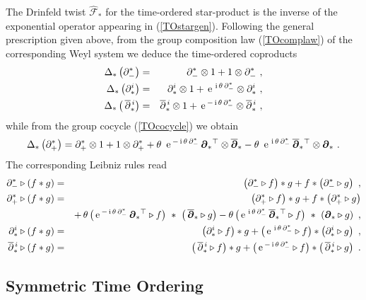 \documentclass[11pt,a4paper]{article}
\newcommand{\1}{\mathbb{1}}
\newcommand{\mbf}[1]{{\boldsymbol {#1} }}
\def\ii{{\,{\rm i}\,}}
\def\mdell{{\mbf\partial}}
\def\e{{\,\rm e}\,}
\def\bea{\begin{eqnarray}}
\def\eea{\end{eqnarray}}
\newcommand{\beq}{\begin{eqnarray}}
\newcommand{\eeq}{\end{eqnarray}}
\begin{document}
The Drinfeld twist $\hat{\mathcal F}_*$ for the time-ordered
star-product is the inverse of the exponential operator appearing in
(\ref{TOstargen}). Following the general prescription given above,
from the group composition law (\ref{TOcomplaw}) of the corresponding
Weyl system we deduce the time-ordered coproducts
\bea
\Delta_*\left(\partial_-^*\right)&=&\partial_-^*\otimes1+
1\otimes\partial_-^* \ , \nonumber\\
\Delta_*\left(\partial^i_*\right)&=&\partial^i_*\otimes1+
\e^{\ii\theta\,\partial_-^*}\otimes\partial^i_* \ , \nonumber\\
\Delta_*\left(\,\overline{\partial}{}^{\,i}_*\right)&=&
\overline{\partial}{}^{\,i}_*\otimes1+\e^{-\ii\theta\,\partial_-^*}
\otimes\overline{\partial}{}^{\,i}_* \ ,
\label{TOcoprods}\eea
while from the group cocycle (\ref{TOcocycle}) we obtain
\beq
\Delta_*\left(\partial_+^*\right)=\partial_+^*\otimes1+
1\otimes\partial_+^*+\theta~\e^{-\ii\theta\,
\partial_-^*}\,\mdell_*{}^\top\otimes\overline{\mdell}_*-\theta~
\e^{\ii\theta\,\partial_-^*}\,
\overline{\mdell}_*{}^\top\otimes\mdell_* \ .
\label{TOcoprodtime}\eeq
The corresponding Leibniz rules read
\bea
\partial_-^*\triangleright(f*g)&=&\left(\partial_-^*\triangleright
f\right)*g+f*\left(\partial_-^*\triangleright g\right) \ , \nonumber\\
\partial_+^*\triangleright(f*g)&=&\left(\partial_+^*\triangleright
f\right)*g+f*\left(\partial_+^*\triangleright g\right)\nonumber\\ &&
+\,\theta\,\bigl(\e^{-\ii\theta\,\partial_-^*}\,\mdell_*{}^\top
\triangleright f\bigr)~*~\left(\,\overline{\mdell}_*
\triangleright g\right)-\theta\,\bigl(\e^{\ii\theta\,\partial_-^*}\,
\overline{\mdell}_*{}^\top
\triangleright f\bigr)~*~\left(\mdell_*\triangleright g\right) \ ,
\nonumber\\ \partial^i_*\triangleright(f*g)&=&\left(\partial^i_*
\triangleright f\right)*g+\bigl(\e^{\ii\theta\,\partial_-^*}
\triangleright f\bigr)*\left(\partial^i_*\triangleright g\right) \ ,
\nonumber\\ \overline{\partial}{}^{\,i}_*
\triangleright(f*g)&=&\left(\,\overline{\partial}{}^{\,i}_*
\triangleright f\right)*g+\bigl(\e^{-\ii\theta\,\partial_-^*}
\triangleright f\bigr)*\left(\,\overline{\partial}{}^{\,i}_*
\triangleright g\right) \ .
\label{TOLeibniz}\eea

\subsection{Symmetric Time Ordering \label{STOcoprod}}
\end{document}

